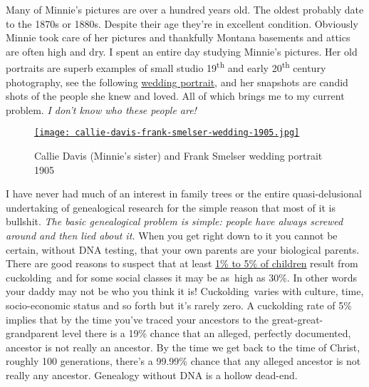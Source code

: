 Many of Minnie's pictures are over a hundred years old. The oldest
probably date to the 1870s or 1880s. Despite their age they're in
excellent condition. Obviously Minnie took care of her pictures and
thankfully Montana basements and attics are often high and dry. I spent
an entire day studying Minnie's pictures. Her old portraits are superb
examples of small studio 19\textsuperscript{th} and early
20\textsuperscript{th} century photography, see the following
\href{https://familysearch.org/pal:/MM9.1.1/F3SR-Q8S}{wedding portrait},
and her snapshots are candid shots of the people she knew and loved. All
of which brings me to my current problem. \emph{I don't know who these
people are!}



\captionsetup[figure]{labelformat=empty}
\begin{SCfigure}
\centering
\href{http://conceptcontrol.smugmug.com/People/Minnie-Raver/i-Z7tfbBJ/A}{\texttt{[image: callie-davis-frank-smelser-wedding-1905.jpg]}}
\caption[Callie Davis and Frank Smelser wedding portrait 1905]{Callie Davis (Minnie's sister) and Frank Smelser wedding portrait 1905}
\label{fig:4230X1}
\end{SCfigure}

I have never had much of an interest in family trees or the entire
quasi-delusional undertaking of genealogical research for the simple
reason that most of it is bullshit. \emph{The basic genealogical problem
is simple: people have always screwed around and then lied about it.}
When you get right down to it you cannot be certain, without DNA
testing, that your own parents are your biological parents. There are
good reasons to suspect that at least
\href{http://www.washingtoncitypaper.com/articles/8308/to-have-and-to-cuckold}{1\%
to 5\% of children} result from cuckolding~and for some social classes
it may be as~high as 30\%. In other words your daddy may not be who you
think it is! Cuckolding~varies with culture, time, socio-economic status
and so forth but it's rarely zero. A cuckolding rate of 5\% implies that
by the time you've traced your ancestors to the great-great-grandparent
level there is a 19\% chance that an alleged, perfectly documented,
ancestor is not really an ancestor. By the time we get back to the time
of Christ, roughly 100 generations, there's a 99.99\% chance that any
alleged ancestor is not really any ancestor. Genealogy without DNA is a
hollow dead-end.

